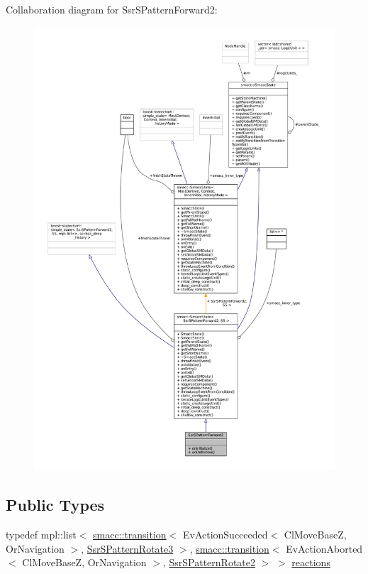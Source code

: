 Collaboration diagram for Ssr\+S\+Pattern\+Forward2\+:
\nopagebreak
\begin{figure}[H]
\begin{center}
\leavevmode
\includegraphics[width=350pt]{structSsrSPatternForward2__coll__graph}
\end{center}
\end{figure}
\subsection*{Public Types}
\begin{DoxyCompactItemize}
\item 
typedef mpl\+::list$<$ \hyperlink{classsmacc_1_1transition}{smacc\+::transition}$<$ Ev\+Action\+Succeeded$<$ Cl\+Move\+BaseZ, Or\+Navigation $>$, \hyperlink{structSsrSPatternRotate3}{Ssr\+S\+Pattern\+Rotate3} $>$, \hyperlink{classsmacc_1_1transition}{smacc\+::transition}$<$ Ev\+Action\+Aborted$<$ Cl\+Move\+BaseZ, Or\+Navigation $>$, \hyperlink{structSsrSPatternRotate2}{Ssr\+S\+Pattern\+Rotate2} $>$ $>$ \hyperlink{structSsrSPatternForward2_a8e3716033d5272a4bd6c42e751bf36b6}{reactions}
\end{DoxyCompactItemize}
